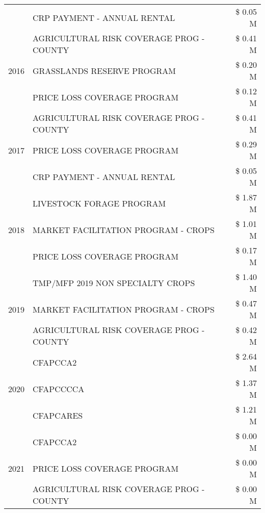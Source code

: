 \begin{tabular}{llr}
 & CRP PAYMENT - ANNUAL RENTAL & \$ 0.05 M \\
\cline{1-3}
\multirow[t]{3}{*}{2016} & AGRICULTURAL RISK COVERAGE PROG - COUNTY & \$ 0.41 M \\
 & GRASSLANDS RESERVE PROGRAM & \$ 0.20 M \\
 & PRICE LOSS COVERAGE PROGRAM & \$ 0.12 M \\
\cline{1-3}
\multirow[t]{3}{*}{2017} & AGRICULTURAL RISK COVERAGE PROG - COUNTY & \$ 0.41 M \\
 & PRICE LOSS COVERAGE PROGRAM & \$ 0.29 M \\
 & CRP PAYMENT - ANNUAL RENTAL & \$ 0.05 M \\
\cline{1-3}
\multirow[t]{3}{*}{2018} & LIVESTOCK FORAGE PROGRAM & \$ 1.87 M \\
 & MARKET FACILITATION PROGRAM - CROPS & \$ 1.01 M \\
 & PRICE LOSS COVERAGE PROGRAM & \$ 0.17 M \\
\cline{1-3}
\multirow[t]{3}{*}{2019} & TMP/MFP 2019 NON SPECIALTY CROPS & \$ 1.40 M \\
 & MARKET FACILITATION PROGRAM - CROPS & \$ 0.47 M \\
 & AGRICULTURAL RISK COVERAGE PROG - COUNTY & \$ 0.42 M \\
\cline{1-3}
\multirow[t]{3}{*}{2020} & CFAPCCA2 & \$ 2.64 M \\
 & CFAPCCCCA & \$ 1.37 M \\
 & CFAPCARES & \$ 1.21 M \\
\cline{1-3}
\multirow[t]{3}{*}{2021} & CFAPCCA2 & \$ 0.00 M \\
 & PRICE LOSS COVERAGE PROGRAM & \$ 0.00 M \\
 & AGRICULTURAL RISK COVERAGE PROG - COUNTY & \$ 0.00 M \\
\cline{1-3}
\bottomrule
\end{tabular}
